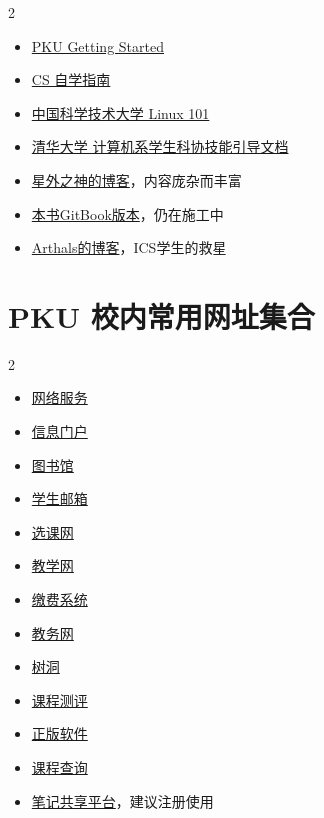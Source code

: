 \begin{multicols}{2}
\begin{itemize}
    \item \href{https://missing.lcpu.dev}{PKU Getting Started}
    \item \href{https://csdiy.wiki/}{CS 自学指南}
    \item \href{https://101.lug.ustc.edu.cn/}{中国科学技术大学 Linux 101}
    \item \href{https://docs.net9.org/}{清华大学 计算机系学生科协技能引导文档}
    \item \href{https://wszqkzqk.github.io/tags}{星外之神的博客}，内容庞杂而丰富
    \item \href{https://lcpu-club.github.io/getting-started-handout-md/}{本书GitBook版本}，仍在施工中
    \item \href{https://arthals.ink/}{Arthals的博客}，ICS学生的救星
\end{itemize}
\end{multicols}

\section*{PKU 校内常用网址集合}

\begin{multicols}{2}
    \begin{itemize}
        \item \href{https://its.pku.edu.cn}{网络服务}
        \item \href{https://portal.pku.edu.cn}{信息门户}
        \item \href{https://lib.pku.edu.cn}{图书馆}
        \item \href{https://mail.stu.pku.edu.cn}{学生邮箱}
        \item \href{https://elective.pku.edu.cn}{选课网}
        \item \href{https://course.pku.edu.cn}{教学网}
        \item \href{https://cwsf.pku.edu.cn}{缴费系统}
        \item \href{https://www.dean.pku.edu.cn}{教务网}
        \item \href{https://treehole.pku.edu.cn}{树洞}
        \item \href{https://courses.pinzhixiaoyuan.com}{课程测评}
        \item \href{https://software.pku.edu.cn}{正版软件}
        \item \href{https://class.wjsphy.top/}{课程查询}
        \item \href{https://pkuhub.cn/}{笔记共享平台}，建议注册使用
    \end{itemize}
\end{multicols}